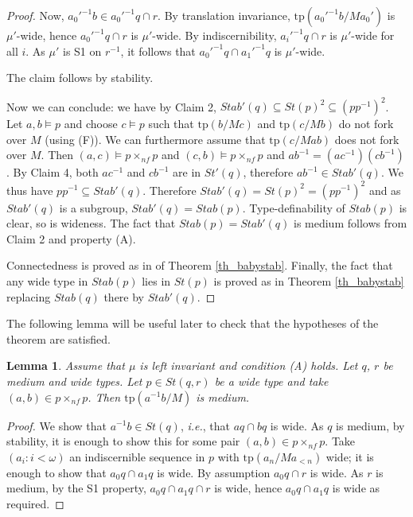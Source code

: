 \documentclass[12pt]{article}
\newtheorem{lemme}[thm]{Lemma}
\theoremstyle{definition}
\theoremstyle{mystyle}
\theoremstyle{remark}
\newcommand{\tp}{\mathrm{tp}}
\newcommand{\nf}{\times_{nf}}
\begin{document}
\begin{proof}
Now, $a_0'^{-1}b \in a_0'^{-1}q\cap r$. By translation invariance,
$\tp(a_0'^{-1}b/Ma_0')$ is $\mu'$-wide, hence $a_0'^{-1}q \cap r$
is $\mu'$-wide. By indiscernibility, $a_i'^{-1}q \cap r$ is
$\mu'$-wide for all $i$. As $\mu'$ is S1 on $r^{-1}$, it follows
that $a_0'^{-1}q\cap a_1'^{-1}q$ is $\mu'$-wide.

The claim follows by stability.

\medskip
Now we can conclude: we have by Claim 2, $Stab'(q)\subseteq
St(p)^2 \subseteq (pp^{-1})^2$. Let $a,b \models p$ and choose
$c\models p$ such that $\tp(b/Mc)$ and $\tp(c/Mb)$ do not fork
over $M$ (using (F)). We can furthermore assume that $\tp(c/Mab)$
does not fork over $M$. Then $(a,c)\models p\nf p$ and
$(c,b)\models p\nf p$ and $ab^{-1} = (ac^{-1})(cb^{-1})$. By Claim
4, both $ac^{-1}$ and $cb^{-1}$ are in $St'(q)$, therefore
$ab^{-1} \in Stab'(q)$. We thus have $pp^{-1}\subseteq Stab'(q)$.
Therefore $Stab'(q)=St(p)^2=(pp^{-1})^2$ and as $Stab'(q)$ is a
subgroup, $Stab'(q)=Stab(p)$. Type-definability of $Stab(p)$ is
clear, so is wideness. The fact that $Stab(p)=Stab'(q)$ is medium
follows from Claim 2 and property (A).

Connectedness is proved as in of Theorem \ref{th_babystab}.
Finally, the fact that any wide type in $Stab(p)$ lies in $St(p)$
is proved as in Theorem \ref{th_babystab} replacing $Stab(q)$
there by $Stab'(q)$.
%
\end{proof}


The following lemma will be useful later to check that the
hypotheses of the theorem are satisfied.

\begin{lemme}\label{lem_stqr}
Assume that $\mu$ is left invariant and condition (A) holds. Let $q$, $r$ be medium and wide types. Let $p\in St(q,r)$ be a wide type and take $(a,b)\in p \nf p$. Then $\tp(a^{-1}b/M)$ is medium.
\end{lemme}
\begin{proof}
We show that $a^{-1}b\in St(q)$, {\it i.e.}, that $aq \cap bq$ is
wide. As $q$ is medium, by stability, it is enough to show this
for some pair $(a,b)\in p\nf p$. Take $(a_i:i<\omega)$ an
indiscernible sequence in $p$ with $\tp(a_n/Ma_{<n})$ wide; it is
enough to show that $a_0q \cap a_1q$ is wide. By assumption $a_0 q
\cap r$ is wide. As $r$ is medium, by the S1 property, $a_0q \cap
a_1q \cap r$ is wide, hence $a_0q \cap a_1 q$ is wide as required.
\end{proof}
\end{document}
